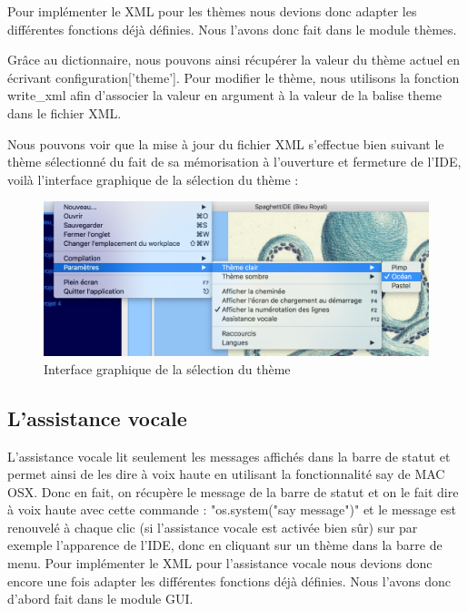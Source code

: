 \documentclass[a4paper,12pt]{article}
\begin{document}
Pour implémenter le XML pour les thèmes nous devions donc adapter les différentes fonctions déjà définies. Nous l'avons donc fait dans le module thèmes.

Grâce au dictionnaire, nous pouvons ainsi récupérer la valeur du thème actuel en écrivant configuration['theme']. Pour modifier le thème, nous utilisons la fonction write\_xml afin d'associer la valeur en argument à la valeur de la balise theme dans le fichier XML. 

Nous pouvons voir que la mise à jour du fichier XML s'effectue bien suivant le thème sélectionné du fait de sa mémorisation à l'ouverture et fermeture de l'IDE, voilà l'interface graphique de la sélection du thème : 

\begin{figure}[h!]
			\begin{center}
				\includegraphics[scale=0.5]{images/themes_selection.png}
				\caption{Interface graphique de la sélection du thème}
			\end{center}
		\end{figure}

\subsection{L'assistance vocale}

L'assistance vocale lit seulement les messages affichés dans la barre de statut et permet ainsi de les dire à voix haute en utilisant la fonctionnalité say de MAC OSX. Donc en fait, on récupère le message de la barre de statut et on le fait dire à voix haute avec cette commande : "os.system("say message")" et le message est renouvelé à chaque clic (si l'assistance vocale est activée bien sûr) sur par exemple l'apparence de l'IDE, donc en cliquant sur un thème dans la barre de menu. Pour implémenter le XML pour l'assistance vocale nous devions donc encore une fois adapter les différentes fonctions déjà définies. Nous l'avons donc d'abord fait dans le module GUI. 
\end{document}
